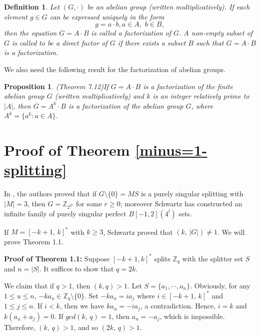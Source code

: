 \documentclass[12pt]{article}
\newtheorem{defn}{Definition}[section]
\newtheorem{open problem}{Open problem}[section]
\newtheorem{prop}{Proposition}[section]
\begin{document}
\begin{defn}Let $(G, \cdot)$ be an abelian group (written multiplicatively). If each element $g\in G$ can be expressed uniquely in the form
$$g = a \cdot b, a \in A,\,\, b \in B,$$
then the equation $G = A \cdot B$ is called a {\it factorization} of $G$. A non-empty subset of $G$ is called to be a {\it direct  factor} of $G$ if there exists a subset $B$ such that $G=A\cdot B$ is a factorization. \end{defn}

We also need the following result for the factorization of abelian groups.

\begin{prop}{\rm (\cite{SzS09}Theorem 7.12)}If $ G = A \cdot B$ is a factorization of the finite abelian group $G$ (written multiplicatively) and $k$ is an integer relatively prime to $|A|$, then $ G = A^k\cdot B$ is a factorization of the abelian group $G$, where $A^k=\{a^k : a \in A\}$.\end{prop}


\section{Proof of Theorem \ref{minus=1-splitting}}



In \cite{[H]}, the authors proved that if $G\setminus \{0\}=MS$ is a purely singular splitting with $|M|=3$,
then $G=\mathbb{Z}_{2^{2r}}$ for some $r\geq 0$; moreover Schwartz \cite{[SC]} has constructed an infinite family of
purely singular perfect $B[-1, 2](4^l)$ sets.


If $M=[-k+1, \,k]^*$ with $k\geq 3$, Schwartz \cite{[SC]} proved that $(k, \,|G|)\neq 1$.
We will prove Theorem 1.1.

{\bf Proof of Theorem 1.1:}
Suppose  $[-k+1,k]^*$ splits $\mathbb{Z}_q$ with the splitter set $S$ and $n=|S|$.
It suffices to show that $q=2k$.

We claim that if $q>1$, then $(k,q)>1$.
Let $S=\{a_1,\cdots ,a_n\}$.
Obviously, for any $1\leq u\leq n$, $-ka_u\in \mathbb{Z}_q\setminus \{0\}.$
Set $-ka_u=ia_j$ where $i\in [-k+1, \,k]^\ast$ and $1\leq j\leq n.$
If $i<k$, then we have $ka_u=-ia_j$, a contradiction.
Hence, $i=k$ and $k(a_u+a_j)=0$.
If $gcd(k, \,q)=1$, then $a_u=-a_j$, which is impossible.
Therefore, $(k, \,q)>1$, and so $(2k, \,q)>1$.
\end{document}
